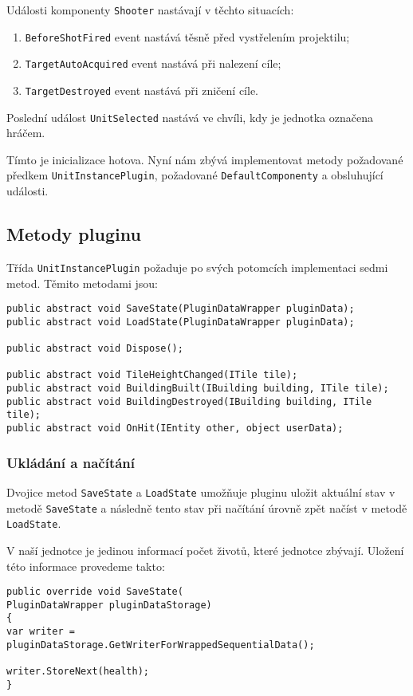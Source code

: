 Události komponenty \texttt{Shooter} nastávají v těchto situacích:

\begin{enumerate}
	\item \texttt{BeforeShotFired} event nastává těsně před vystřelením projektilu;
	\item \texttt{TargetAutoAcquired} event nastává při nalezení cíle;
	\item \texttt{TargetDestroyed} event nastává při zničení cíle.
\end{enumerate}

Poslední událost \texttt{UnitSelected} nastává ve chvíli, kdy je jednotka označena hráčem.


Tímto je inicializace hotova. Nyní nám zbývá implementovat metody požadované předkem \texttt{UnitInstancePlugin}, požadované \texttt{DefaultComponenty} a obsluhující události.

\subsection{Metody pluginu}

Třída \texttt{UnitInstancePlugin} požaduje po svých potomcích implementaci sedmi metod. Těmito metodami jsou:
\begin{lstlisting}
public abstract void SaveState(PluginDataWrapper pluginData);
public abstract void LoadState(PluginDataWrapper pluginData);

public abstract void Dispose();

public abstract void TileHeightChanged(ITile tile);
public abstract void BuildingBuilt(IBuilding building, ITile tile);
public abstract void BuildingDestroyed(IBuilding building, ITile tile);
public abstract void OnHit(IEntity other, object userData);
\end{lstlisting}


\subsubsection{Ukládání a načítání}

Dvojice metod \texttt{SaveState} a \texttt{LoadState} umožňuje pluginu uložit aktuální stav v metodě \texttt{SaveState} a následně tento stav při načítání úrovně zpět načíst v metodě \texttt{LoadState}.

V naší jednotce je jedinou informací počet životů, které jednotce zbývají. Uložení této informace provedeme takto:
\begin{lstlisting}
public override void SaveState(
PluginDataWrapper pluginDataStorage)
{
var writer = 
pluginDataStorage.GetWriterForWrappedSequentialData();

writer.StoreNext(health);
}
\end{lstlisting}


